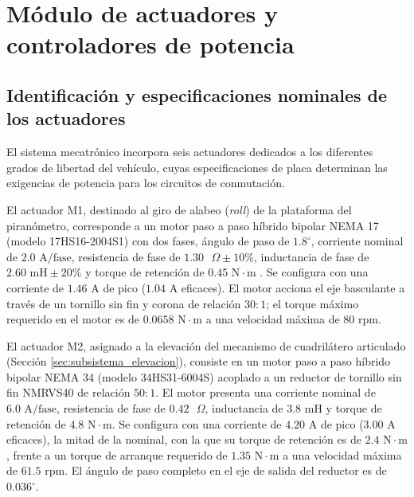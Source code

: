 \documentclass[../../General.tex]{subfiles}
\begin{document}
\section{Módulo de actuadores y controladores de potencia}

\subsection{Identificación y especificaciones nominales de los actuadores}

El sistema mecatrónico incorpora seis actuadores dedicados a los diferentes grados de libertad del vehículo, cuyas especificaciones de placa determinan las exigencias de potencia para los circuitos de conmutación.

El actuador M1, destinado al giro de alabeo (\textit{roll}) de la plataforma del piranómetro, corresponde a un motor paso a paso híbrido bipolar NEMA 17 (modelo 17HS16-2004S1) con dos fases, ángulo de paso de $1.8^\circ$, corriente nominal de $2.0\text{ A/fase}$, resistencia de fase de $1.30\text{ }\Omega \pm 10\%$, inductancia de fase de $2.60\text{ mH} \pm 20\%$ y torque de retención de $0.45\text{ N}\cdot\text{m}$ \citep{stepperonline_17hs16}. Se configura con una corriente de $1.46\text{ A}$ de pico ($1.04\text{ A}$ eficaces). El motor acciona el eje basculante a través de un tornillo sin fin y corona de relación $30:1$; el torque máximo requerido en el motor es de $0.0658\text{ N}\cdot\text{m}$ a una velocidad máxima de $80\text{ rpm}$.

El actuador M2, asignado a la elevación del mecanismo de cuadrilátero articulado (Sección \ref{sec:subsistema_elevacion}), consiste en un motor paso a paso híbrido bipolar NEMA 34 (modelo 34HS31-6004S) acoplado a un reductor de tornillo sin fin NMRVS40 de relación $50:1$. El motor presenta una corriente nominal de $6.0\text{ A/fase}$, resistencia de fase de $0.42\text{ }\Omega$, inductancia de $3.8\text{ mH}$ y torque de retención de $4.8\text{ N}\cdot\text{m}$. Se configura con una corriente de $4.20\text{ A}$ de pico ($3.00\text{ A}$ eficaces), la mitad de la nominal, con la que su torque de retención es de $2.4\text{ N}\cdot\text{m}$, frente a un torque de arranque requerido de $1.35\text{ N}\cdot\text{m}$ a una velocidad máxima de $61.5\text{ rpm}$. El ángulo de paso completo en el eje de salida del reductor es de $0.036^\circ$.
\end{document}
